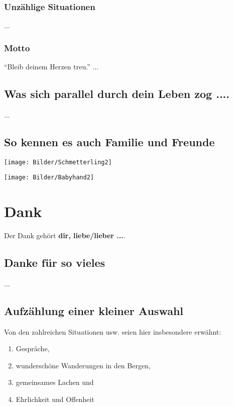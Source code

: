 \documentclass[12pt,ngerman,parskip=full]{scrreprt}
\begin{document}
\subsection{Unzählige Situationen}
...
\subsection{Motto}
\enquote{Bleib deinem Herzen treu.} ...
\section{Was sich parallel durch dein Leben zog .... }
... 
\section{So kennen es auch Familie und Freunde}

\begin{center}
\texttt{[image: Bilder/Schmetterling2]}\label{fig:Schmetterling2}
\end{center}

\begin{center}
\texttt{[image: Bilder/Babyhand2]}\label{fig:Babyhand1}
\end{center}


\chapter{Dank}
Der Dank gehört \textbf{dir, liebe/lieber ...}. 
\section {Danke für so vieles}
... 
\section{Aufzählung einer kleiner Auswahl}
Von den zahlreichen Situationen usw. seien hier insbesondere erwähnt:  
\begin{enumerate}
\item Gespräche, 
\item wunderschöne Wanderungen in den Bergen, 
\item gemeinsames Lachen und  
\item Ehrlichkeit und Offenheit
\end{enumerate}
\end{document}
